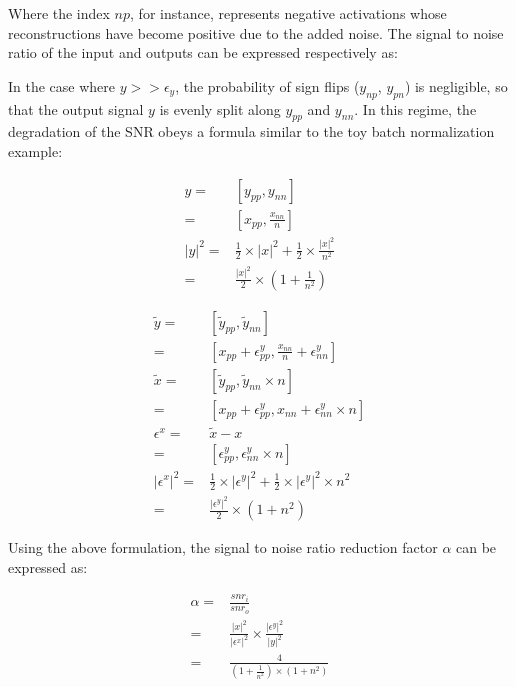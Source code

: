\documentclass[twocolumn]{bmcart}
\begin{document}
Where the index $np$, for instance, represents negative activations whose reconstructions have become positive due to the added noise.
The signal to noise ratio of the input and outputs can be expressed respectively as:

In the case where $y >> \epsilon_y$, the probability of sign flips ($y_{np}$, $y_{pn}$) is negligible,
so that the output signal $y$ is evenly split along $y_{pp}$ and $y_{nn}$.
In this regime, the degradation of the SNR obeys a formula similar to the toy batch normalization example:

\begin{subequations}
\begin{align}
 y =& [y_{pp}, y_{nn}] \\
   =& [x_{pp}, \frac{x_{nn}}{n}] \\
 |y|^2 =& \frac{1}{2} \times |x|^2 + \frac{1}{2} \times \frac{|x|^2}{n^2} \\
       =&\frac{|x|^2}{2} \times (1+\frac{1}{n^2})
\end{align}
\end{subequations}

\begin{subequations}
\begin{align}
\tilde{y}       =& [ \tilde{y}_{pp}, \tilde{y}_{nn}] \\
                =& [ x_{pp} + \epsilon_{pp}^y, \frac{x_{nn}}{n} + \epsilon_{nn}^y ] \\
\tilde{x}       =& [ \tilde{y}_{pp}, \tilde{y}_{nn} \times n] \\
                =& [ x_{pp} + \epsilon_{pp}^y, x_{nn} + \epsilon_{nn}^y \times n  ]\\
\epsilon^x      =& \tilde{x} - x\\
                =& [ \epsilon_{pp}^y, \epsilon_{nn}^y \times n ]\\
|\epsilon^x|^2  =& \frac{1}{2} \times |\epsilon^y|^2 + \frac{1}{2} \times |\epsilon^y|^2 \times n^2 \\
                =& \frac{|\epsilon^y|^2}{2} \times (1 + n^2)
\end{align}
\end{subequations}

Using the above formulation, the signal to noise ratio reduction factor $\alpha$ can be expressed as:

\begin{subequations}
\begin{align}
\alpha =& \frac{snr_i}{snr_o} \\
       =& \frac{|x|^2}{|\epsilon^x|^2} \times  \frac{|\epsilon^y|^2}{|y|^2} \\
       =& \frac{4}{(1+\frac{1}{n^2}) \times (1 + n^2)}
\end{align}
\end{subequations}
\end{document}

